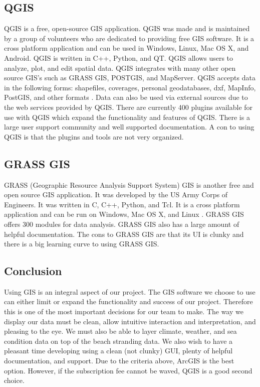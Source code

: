 \documentclass[onecolumn, draftclsnofoot,10pt, compsoc]{IEEEtran}
\begin{document}
\begin{singlespace}
\subsection{QGIS}
QGIS is a free, open-source GIS application. QGIS was made and is maintained by a group of volunteers who are dedicated to providing free GIS software. It is a cross platform application and can be used in Windows, Linux, Mac OS X, and Android. QGIS is written in C++, Python, and QT. QGIS allows users to analyze, plot, and edit spatial data. QGIS integrates with many other open source GIS's such as GRASS GIS, POSTGIS, and MapServer\cite{QGIS-WIKIPEDIA}. QGIS accepts data in the following forms: shapefiles, coverages, personal geodatabases, dxf, MapInfo, PostGIS, and other formats \cite{QGIS-WIKIPEDIA}. Data can also be used via external sources due to the web services provided by QGIS. There are currently 400 plugins available for use with QGIS which expand the functionality and features of QGIS. There is a large user support community and well supported documentation. A con to using QGIS is that the plugins and tools are not very organized.

\subsection{GRASS GIS}
GRASS (Geographic Resource Analysis Support System) GIS is another free and open source GIS application. It was developed by the US Army Corps of Engineers. It was written in C, C++, Python, and Tcl. It is a cross platform application and can be run on Windows, Mac OS X, and Linux \cite{GRASS-WIKIPEDIA}. GRASS GIS offers 300 modules for data analysis. GRASS GIS also has a large amount of helpful documentation. The cons to GRASS GIS are that its UI is clunky and there is a big learning curve to using GRASS GIS. 

\subsection{Conclusion}
Using GIS is an integral aspect of our project. The GIS software we choose to use can either limit or expand the functionality and success of our project. Therefore this is one of the most important decisions for our team to make. The way we display our data must be clean, allow intuitive interaction and interpretation, and pleasing to the eye. We must also be able to layer climate, weather, and sea condition data on top of the beach stranding data. We also wish to have a pleasant time developing using a clean (not clunky) GUI, plenty of helpful documentation, and support. Due to the criteria above, ArcGIS is the best option. However, if the subscription fee cannot be waved, QGIS is a good second choice. 


\end{singlespace}
\end{document}
